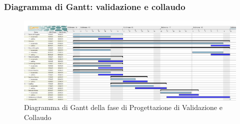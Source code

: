 \subsubsection{Diagramma di Gantt: validazione e collaudo}
\begin{figure}[H]
    \centering
    \includegraphics[scale = 0.25]{components/img/validazione_collaudo.jpg}
    \caption{Diagramma di Gantt della fase di Progettazione di Validazione e Collaudo}
    \label{fig:Diagramma di Gantt, fase di Validazione e collaudo}
\end{figure}
